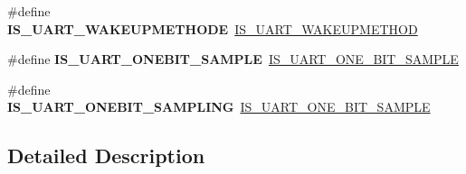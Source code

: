 \begin{DoxyCompactItemize}
\item 
\mbox{\label{group___h_a_l___u_a_r_t___aliased___macros_gaf1bb7de79bc052cd2a1a6671c9c6687d}} 
\#define {\bfseries I\+S\+\_\+\+U\+A\+R\+T\+\_\+\+W\+A\+K\+E\+U\+P\+M\+E\+T\+H\+O\+DE}~\mbox{\hyperlink{group___u_a_r_t___private___macros_ga144aecf3ad6ca3ce6653ae113c9a6141}{I\+S\+\_\+\+U\+A\+R\+T\+\_\+\+W\+A\+K\+E\+U\+P\+M\+E\+T\+H\+OD}}
\item 
\mbox{\label{group___h_a_l___u_a_r_t___aliased___macros_ga5cc20fb4146a1269b5b8a81d5e4578fa}} 
\#define {\bfseries I\+S\+\_\+\+U\+A\+R\+T\+\_\+\+O\+N\+E\+B\+I\+T\+\_\+\+S\+A\+M\+P\+LE}~\mbox{\hyperlink{group___u_a_r_t___private___macros_ga6452a4420dac4abd4f0ea0e1677f37a9}{I\+S\+\_\+\+U\+A\+R\+T\+\_\+\+O\+N\+E\+\_\+\+B\+I\+T\+\_\+\+S\+A\+M\+P\+LE}}
\item 
\mbox{\label{group___h_a_l___u_a_r_t___aliased___macros_gae24c4fef26c5d50f9c8d27f0db203a5b}} 
\#define {\bfseries I\+S\+\_\+\+U\+A\+R\+T\+\_\+\+O\+N\+E\+B\+I\+T\+\_\+\+S\+A\+M\+P\+L\+I\+NG}~\mbox{\hyperlink{group___u_a_r_t___private___macros_ga6452a4420dac4abd4f0ea0e1677f37a9}{I\+S\+\_\+\+U\+A\+R\+T\+\_\+\+O\+N\+E\+\_\+\+B\+I\+T\+\_\+\+S\+A\+M\+P\+LE}}
\end{DoxyCompactItemize}


\subsection{Detailed Description}
